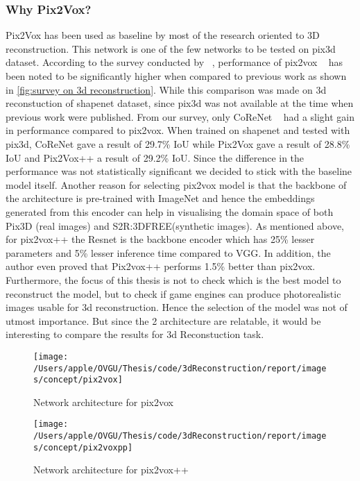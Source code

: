 \subsubsection{Why Pix2Vox?}
Pix2Vox has been used as baseline by most of the research oriented to 3D reconstruction.
This network is one of the few networks to be tested on pix3d dataset.
According to the survey conducted by ~\cite{Han2021ImageBased3O}, performance of pix2vox ~\cite{Xie_2019}
has been noted to be significantly higher when compared to previous work  as shown in \ref{fig:survey on 3d reconstruction}.
While this comparison was made on 3d reconstuction of shapenet dataset, since pix3d was not available at the time when previous work were published.
From our survey, only CoReNet ~\cite{popov2020corenet} had a slight gain in performance compared to pix2vox.
When trained on shapenet and tested with pix3d, CoReNet gave a result of 29.7\% IoU while Pix2Vox gave a result of 28.8\% IoU and Pix2Vox++ a result of 29.2\% IoU.
Since the difference in the performance was not statistically significant we decided to stick with the baseline model itself.
Another reason for selecting pix2vox model is that the backbone of the architecture is pre-trained with ImageNet and
hence the embeddings generated from this encoder can help in visualising the domain space of both Pix3D (real images) and S2R:3DFREE(synthetic images).
As mentioned above, for pix2vox++ the Resnet is the backbone encoder which has 25\% lesser parameters and 5\% lesser inference time compared to VGG.
In addition, the author even proved that Pix2vox++ performs 1.5\% better than pix2vox.
Furthermore, the focus of this thesis is not to check which is the best model to reconstruct the model, but to check if game engines can produce photorealistic images usable for 3d reconstruction.
Hence the selection of the model was not of utmost importance.
But since the 2 architecture are relatable, it would be interesting to compare the results for 3d Reconstuction task.
\begin{figure}
    \centering
    \texttt{[image: /Users/apple/OVGU/Thesis/code/3dReconstruction/report/images/concept/pix2vox]}
    \caption{Network architecture for pix2vox~\cite{Xie_2019}}
    \label{fig:pix2vox architecture}
\end{figure}

\begin{figure}
    \centering
    \texttt{[image: /Users/apple/OVGU/Thesis/code/3dReconstruction/report/images/concept/pix2voxpp]}
    \caption{Network architecture for pix2vox++~\cite{Xie_2020}}
    \label{fig:pix2voxpp architecture}
\end{figure}

